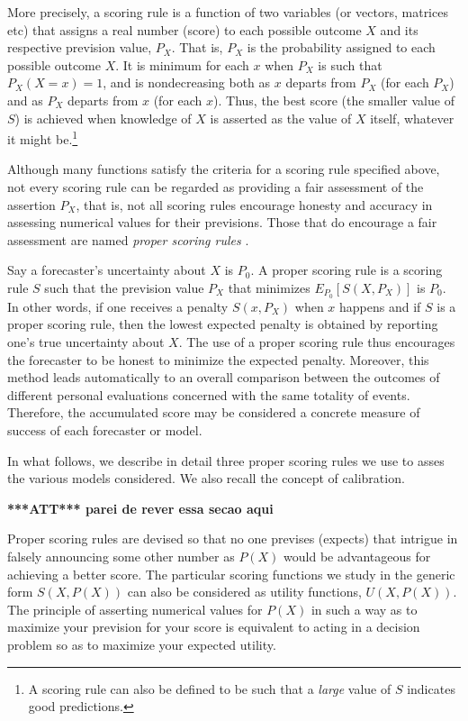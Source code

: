 \documentclass[journal,article,accept,moreauthors,pdftex,12pt,a4paper]{mdpi}
\newcommand{\red}[1]{\textbf{\color{red} ***ATT*** #1}}
\begin{document}
More precisely, a scoring rule is a function of two variables (or vectors, matrices etc) that assigns a real number (score) to each possible outcome $X$ and its respective prevision value, $P_X$. That is, $P_X$ is the probability assigned to each possible
outcome $X$.
It is minimum for each $x$ when $P_X$ is such that $P_X(X=x)=1$, and is nondecreasing both as $x$ departs from $P_X$ (for each $P_X$) and as $P_X$ departs from $x$ (for each $x$).
Thus, the best score (the smaller value of $S$) is achieved when knowledge of $X$ is asserted as the value of $X$ itself, whatever it might be.\footnote{A scoring rule can also be defined to be such that a \emph{large}
value of $S$ indicates good predictions.} 

Although many functions satisfy the criteria for a scoring rule specified above, not every scoring rule can be regarded as providing a fair assessment of the assertion $P_X$, that is, not all scoring rules encourage honesty and accuracy in assessing numerical values for their previsions.
Those that do encourage a fair assessment are named \emph{proper scoring rules} \cite{lad}.

Say a forecaster's uncertainty about $X$ is $P_0$. A proper scoring rule is a scoring rule $S$ such that the prevision value $P_X$ that minimizes $E_{P_0}[S(X,P_X)]$ is $P_0$. 
In other words, if one receives a penalty $S(x,P_X)$ when $x$ happens and if $S$ is a proper scoring rule, then the lowest expected penalty is obtained by reporting one's  true uncertainty about $X$.
The use of a proper scoring rule thus encourages the forecaster to be honest to minimize the expected penalty.
Moreover, this method leads automatically to an overall comparison between the outcomes of different personal evaluations concerned with the same totality of events.
Therefore, the accumulated score may be considered a concrete measure of success of each forecaster or model.

In what follows, we describe in detail three proper scoring rules we use to asses the various models considered. 
We also recall the concept of calibration.

\red{parei de rever essa secao aqui}

Proper scoring rules are devised so that no one previses (expects) that intrigue in falsely announcing some other number as $P(X)$ would be advantageous for achieving a better score.
The particular scoring functions we study in the generic form $S(X,P(X))$ can also be considered as utility functions, $U(X,P(X))$.
The principle of asserting numerical values for $P(X)$ in such a way as to maximize your prevision for your score is equivalent to acting in a decision problem so as to maximize your expected utility.
\end{document}
